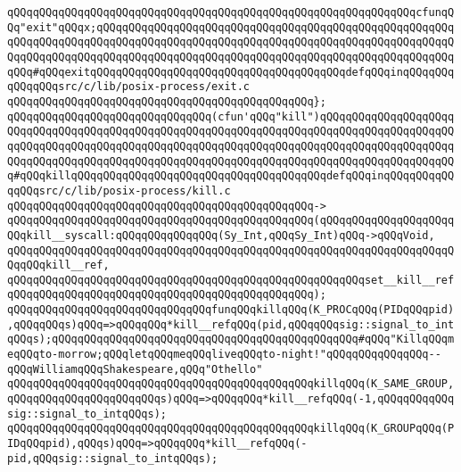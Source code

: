 \verb|qQQqqQQqqQQqqQQqqQQqqQQqqQQqqQQqqQQqqQQqqQQqqQQqqQQqqQQqqQQqqQQqcfunqQQq"exit"qQQqx;qQQqqQQqqQQqqQQqqQQqqQQqqQQqqQQqqQQqqQQqqQQqqQQqqQQqqQQqqQQqqQQqqQQqqQQqqQQqqQQqqQQqqQQqqQQqqQQqqQQqqQQqqQQqqQQqqQQqqQQqqQQqqQQqqQQqqQQqqQQqqQQqqQQqqQQqqQQqqQQqqQQqqQQqqQQqqQQqqQQqqQQqqQQqqQQqqQQqqQQq#qQQqexitqQQqqQQqqQQqqQQqqQQqqQQqqQQqqQQqqQQqqQQqdefqQQqinqQQqqQQqqQQqqQQqsrc/c/lib/posix-process/exit.c|\newline
\verb|qQQqqQQqqQQqqQQqqQQqqQQqqQQqqQQqqQQqqQQqqQQqqQQq};|\newline
\newline
\verb|qQQqqQQqqQQqqQQqqQQqqQQqqQQqqQQq(cfun'qQQq"kill")qQQqqQQqqQQqqQQqqQQqqQQqqQQqqQQqqQQqqQQqqQQqqQQqqQQqqQQqqQQqqQQqqQQqqQQqqQQqqQQqqQQqqQQqqQQqqQQqqQQqqQQqqQQqqQQqqQQqqQQqqQQqqQQqqQQqqQQqqQQqqQQqqQQqqQQqqQQqqQQqqQQqqQQqqQQqqQQqqQQqqQQqqQQqqQQqqQQqqQQqqQQqqQQqqQQqqQQqqQQqqQQqqQQqqQQq#qQQqkillqQQqqQQqqQQqqQQqqQQqqQQqqQQqqQQqqQQqqQQqdefqQQqinqQQqqQQqqQQqqQQqsrc/c/lib/posix-process/kill.c|\newline
\verb|qQQqqQQqqQQqqQQqqQQqqQQqqQQqqQQqqQQqqQQqqQQqqQQq->|\newline
\verb|qQQqqQQqqQQqqQQqqQQqqQQqqQQqqQQqqQQqqQQqqQQqqQQq(qQQqqQQqqQQqqQQqqQQqqQQqkill__syscall:qQQqqQQqqQQqqQQq(Sy_Int,qQQqSy_Int)qQQq->qQQqVoid,|\newline
\verb|qQQqqQQqqQQqqQQqqQQqqQQqqQQqqQQqqQQqqQQqqQQqqQQqqQQqqQQqqQQqqQQqqQQqqQQqqQQqkill__ref,|\newline
\verb|qQQqqQQqqQQqqQQqqQQqqQQqqQQqqQQqqQQqqQQqqQQqqQQqqQQqqQQqset__kill__ref|\newline
\verb|qQQqqQQqqQQqqQQqqQQqqQQqqQQqqQQqqQQqqQQqqQQqqQQq);|\newline
\newline
\newline
\verb|qQQqqQQqqQQqqQQqqQQqqQQqqQQqqQQqfunqQQqkillqQQq(K_PROCqQQq(PIDqQQqpid),qQQqqQQqs)qQQq=>qQQqqQQq*kill__refqQQq(pid,qQQqqQQqsig::signal_to_intqQQqs);qQQqqQQqqQQqqQQqqQQqqQQqqQQqqQQqqQQqqQQqqQQqqQQq#qQQq"KillqQQqmeqQQqto-morrow;qQQqletqQQqmeqQQqliveqQQqto-night!"qQQqqQQqqQQqqQQq--qQQqWilliamqQQqShakespeare,qQQq"Othello"|\newline
\verb|qQQqqQQqqQQqqQQqqQQqqQQqqQQqqQQqqQQqqQQqqQQqqQQqkillqQQq(K_SAME_GROUP,qQQqqQQqqQQqqQQqqQQqqQQqs)qQQq=>qQQqqQQq*kill__refqQQq(-1,qQQqqQQqqQQqsig::signal_to_intqQQqs);|\newline
\verb|qQQqqQQqqQQqqQQqqQQqqQQqqQQqqQQqqQQqqQQqqQQqqQQqkillqQQq(K_GROUPqQQq(PIDqQQqpid),qQQqs)qQQq=>qQQqqQQq*kill__refqQQq(-pid,qQQqsig::signal_to_intqQQqs);|\newline
